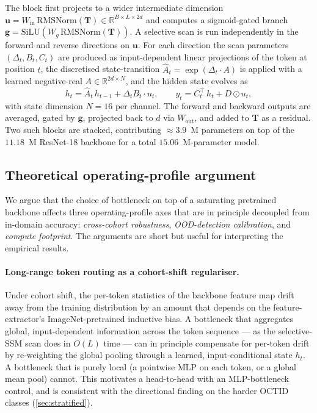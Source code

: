 \documentclass[5p]{elsarticle}
\begin{document}
The block first projects to a wider intermediate dimension $\mathbf{u} = W_{\text{in}}\, \mathrm{RMSNorm}(\mathbf{T}) \in \mathbb{R}^{B \times L \times 2d}$ and computes a sigmoid-gated branch $\mathbf{g} = \mathrm{SiLU}(W_g\, \mathrm{RMSNorm}(\mathbf{T}))$. A selective scan is run independently in the forward and reverse directions on $\mathbf{u}$. For each direction the scan parameters $(\Delta_t, B_t, C_t)$ are produced as input-dependent linear projections of the token at position $t$, the discretised state-transition $\hat{A}_t = \exp(\Delta_t \cdot A)$ is applied with a learned negative-real $A \in \mathbb{R}^{2d \times N}$, and the hidden state evolves as
\begin{equation}
    h_t = \hat{A}_t\,h_{t-1} + \Delta_t B_t \cdot u_t,\qquad y_t = C_t^{\!\top}\,h_t + D \odot u_t,
\end{equation}
with state dimension $N=16$ per channel. The forward and backward outputs are averaged, gated by $\mathbf{g}$, projected back to $d$ via $W_{\text{out}}$, and added to $\mathbf{T}$ as a residual. Two such blocks are stacked, contributing $\approx 3.9$~M parameters on top of the $11.18$~M ResNet-18 backbone for a total $15.06$~M-parameter model.

\subsection{Theoretical operating-profile argument}
\label{sec:theory}
We argue that the choice of bottleneck on top of a saturating pretrained backbone affects three operating-profile axes that are in principle decoupled from in-domain accuracy: \emph{cross-cohort robustness}, \emph{OOD-detection calibration}, and \emph{compute footprint}. The arguments are short but useful for interpreting the empirical results.

\paragraph{Long-range token routing as a cohort-shift regulariser.} Under cohort shift, the per-token statistics of the backbone feature map drift away from the training distribution by an amount that depends on the feature-extractor's ImageNet-pretrained inductive bias. A bottleneck that aggregates global, input-dependent information across the token sequence --- as the selective-SSM scan does in $O(L)$ time --- can in principle compensate for per-token drift by re-weighting the global pooling through a learned, input-conditional state $h_t$. A bottleneck that is purely local (a pointwise MLP on each token, or a global mean pool) cannot. This motivates a head-to-head with an MLP-bottleneck control, and is consistent with the directional finding on the harder OCTID classes (\cref{sec:stratified}).
\end{document}
